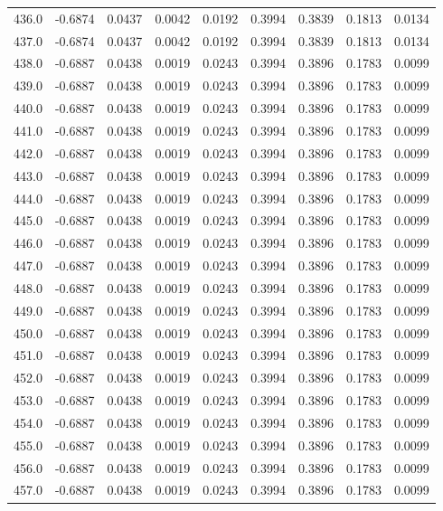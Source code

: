 \begin{longtable}{lrrrrrrrr}
436.0 & -0.6874 & 0.0437 & 0.0042 & 0.0192 & 0.3994 & 0.3839 & 0.1813 & 0.0134 \\
437.0 & -0.6874 & 0.0437 & 0.0042 & 0.0192 & 0.3994 & 0.3839 & 0.1813 & 0.0134 \\
438.0 & -0.6887 & 0.0438 & 0.0019 & 0.0243 & 0.3994 & 0.3896 & 0.1783 & 0.0099 \\
439.0 & -0.6887 & 0.0438 & 0.0019 & 0.0243 & 0.3994 & 0.3896 & 0.1783 & 0.0099 \\
440.0 & -0.6887 & 0.0438 & 0.0019 & 0.0243 & 0.3994 & 0.3896 & 0.1783 & 0.0099 \\
441.0 & -0.6887 & 0.0438 & 0.0019 & 0.0243 & 0.3994 & 0.3896 & 0.1783 & 0.0099 \\
442.0 & -0.6887 & 0.0438 & 0.0019 & 0.0243 & 0.3994 & 0.3896 & 0.1783 & 0.0099 \\
443.0 & -0.6887 & 0.0438 & 0.0019 & 0.0243 & 0.3994 & 0.3896 & 0.1783 & 0.0099 \\
444.0 & -0.6887 & 0.0438 & 0.0019 & 0.0243 & 0.3994 & 0.3896 & 0.1783 & 0.0099 \\
445.0 & -0.6887 & 0.0438 & 0.0019 & 0.0243 & 0.3994 & 0.3896 & 0.1783 & 0.0099 \\
446.0 & -0.6887 & 0.0438 & 0.0019 & 0.0243 & 0.3994 & 0.3896 & 0.1783 & 0.0099 \\
447.0 & -0.6887 & 0.0438 & 0.0019 & 0.0243 & 0.3994 & 0.3896 & 0.1783 & 0.0099 \\
448.0 & -0.6887 & 0.0438 & 0.0019 & 0.0243 & 0.3994 & 0.3896 & 0.1783 & 0.0099 \\
449.0 & -0.6887 & 0.0438 & 0.0019 & 0.0243 & 0.3994 & 0.3896 & 0.1783 & 0.0099 \\
450.0 & -0.6887 & 0.0438 & 0.0019 & 0.0243 & 0.3994 & 0.3896 & 0.1783 & 0.0099 \\
451.0 & -0.6887 & 0.0438 & 0.0019 & 0.0243 & 0.3994 & 0.3896 & 0.1783 & 0.0099 \\
452.0 & -0.6887 & 0.0438 & 0.0019 & 0.0243 & 0.3994 & 0.3896 & 0.1783 & 0.0099 \\
453.0 & -0.6887 & 0.0438 & 0.0019 & 0.0243 & 0.3994 & 0.3896 & 0.1783 & 0.0099 \\
454.0 & -0.6887 & 0.0438 & 0.0019 & 0.0243 & 0.3994 & 0.3896 & 0.1783 & 0.0099 \\
455.0 & -0.6887 & 0.0438 & 0.0019 & 0.0243 & 0.3994 & 0.3896 & 0.1783 & 0.0099 \\
456.0 & -0.6887 & 0.0438 & 0.0019 & 0.0243 & 0.3994 & 0.3896 & 0.1783 & 0.0099 \\
457.0 & -0.6887 & 0.0438 & 0.0019 & 0.0243 & 0.3994 & 0.3896 & 0.1783 & 0.0099 \\

\end{longtable}
